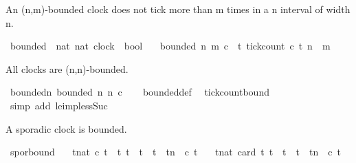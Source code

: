 \begin{isabellebody}
%
\endisatagproof
{\isafoldproof}%
%
\isadelimproof
%
\endisadelimproof
%
\isadelimdocument
%
\endisadelimdocument
%
\isatagdocument
%
\isamarkuptrue%
%
\endisatagdocument
{\isafolddocument}%
%
\isadelimdocument
%
\endisadelimdocument
%
\begin{isamarkuptext}%
An (n,m)-bounded clock does not tick more than m times in a n interval of width n.%
\end{isamarkuptext}\isamarkuptrue%
\isamarkupfalse%
\ bounded\ {\isacharcolon}{\isacharcolon}\ {\isacartoucheopen}{\isacharbrackleft}nat{\isacharcomma}\ nat{\isacharcomma}\ clock{\isacharbrackright}\ {\isasymRightarrow}\ bool{\isacartoucheclose}\isanewline
\ \ \ {\isacartoucheopen}bounded\ n\ m\ c\ {\isasymequiv}\ {\isasymforall}t{\isachardot}\ tick{\isacharunderscore}count\ c\ t\ n\ {\isasymle}\ m{\isacartoucheclose}%
\begin{isamarkuptext}%
All clocks are (n,n)-bounded.%
\end{isamarkuptext}\isamarkuptrue%
\isamarkupfalse%
\ bounded{\isacharunderscore}n{\isacharcolon}\ {\isacartoucheopen}bounded\ n\ n\ c{\isacartoucheclose}\isanewline
%
\isadelimproof
\ \ %
\endisadelimproof
%
\isatagproof
{}\isamarkupfalse%
\ bounded{\isacharunderscore}def\ \isamarkupfalse%
\ tick{\isacharunderscore}count{\isacharunderscore}bound\ \isamarkupfalse%
\ {\isacharparenleft}simp\ add{\isacharcolon}\ le{\isacharunderscore}imp{\isacharunderscore}less{\isacharunderscore}Suc{\isacharparenright}%
\endisatagproof
{\isafoldproof}%
%
\isadelimproof
%
\endisadelimproof
%
\begin{isamarkuptext}%
A sporadic clock is bounded.%
\end{isamarkuptext}\isamarkuptrue%
\isamarkupfalse%
\ spor{\isacharunderscore}bound{\isacharcolon}\isanewline
\ \ \ {\isacartoucheopen}{\isasymforall}t{\isacharcolon}{\isacharcolon}nat{\isachardot}\ c\ t\ {\isasymlongrightarrow}\ {\isacharparenleft}{\isasymforall}t{\isacharprime}{\isachardot}\ {\isacharparenleft}t\ {\isacharless}\ t{\isacharprime}\ {\isasymand}\ t{\isacharprime}\ {\isasymle}\ t{\isacharplus}n{\isacharparenright}\ {\isasymlongrightarrow}\ {\isasymnot}{\isacharparenleft}c\ t{\isacharprime}{\isacharparenright}{\isacharparenright}{\isacartoucheclose}\isanewline
\ \ \ {\isacartoucheopen}{\isasymforall}t{\isacharcolon}{\isacharcolon}nat{\isachardot}\ card\ {\isacharbraceleft}t{\isacharprime}{\isachardot}\ t\ {\isasymle}\ t{\isacharprime}\ {\isasymand}\ t{\isacharprime}\ {\isasymle}\ t{\isacharplus}n\ {\isasymand}\ c\ t{\isacharprime}{\isacharbraceright}\ {\isasymle}\ {}{\isacartoucheclose}\isanewline

\end{isabellebody}
